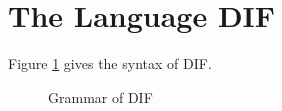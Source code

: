 \section{The Language DIF}
Figure \ref{grammar} gives the syntax of DIF.

\begin{figure}[h]
    
    \caption{Grammar of DIF}
    \label{grammar}
\end{figure}
